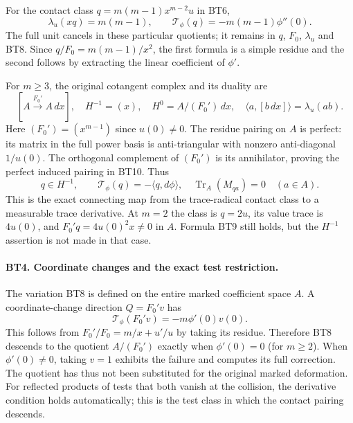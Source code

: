 \documentclass[11pt,a4paper]{article}
\theoremstyle{definition}\newtheorem{definition}[theorem]{Definition}
\begin{document}
For the contact class $q=m(m-1)x^{m-2}u$ in BT6,
\[
 \boxed{\lambda_u(xq)=m(m-1),\qquad
        \mathcal T_\phi(q)=-m(m-1)\phi''(0).}
 \tag{BT9}
\]
The full unit cancels in these particular quotients; it remains
in $q$, $F_0$, $\lambda_u$ and BT8. Since $q/F_0=m(m-1)/x^2$,
the first formula is a simple residue and the second follows by
extracting the linear coefficient of $\phi'$.

For $m\ge3$, the original cotangent complex and its duality are
\[
 [A\xrightarrow{F_0'}A\,dx],\quad
 H^{-1}=(x),\quad H^0=A/(F_0')\,dx,
 \quad\langle a,[b\,dx]\rangle=\lambda_u(ab).
 \tag{BT10}
\]
Here $(F_0')=(x^{m-1})$ since $u(0)\ne0$. The residue pairing
on $A$ is perfect: its matrix in the full power basis is
anti-triangular with nonzero anti-diagonal $1/u(0)$. The
orthogonal complement of $(F_0')$ is its annihilator, proving
the perfect induced pairing in BT10. Thus
\[
 q\in H^{-1},\qquad
 \mathcal T_\phi(q)=-\langle q,d\phi\rangle,
 \quad\operatorname{Tr}_A(M_{qa})=0\quad(a\in A).
 \tag{BT11}
\]
This is the exact connecting map from the trace-radical contact
class to a measurable trace derivative. At $m=2$ the class is
$q=2u$, its value trace is $4u(0)$, and
$F_0'q=4u(0)^2x\ne0$ in $A$. Formula BT9 still holds, but
the $H^{-1}$ assertion is not made in that case.

\paragraph{BT4. Coordinate changes and the exact test restriction.}
The variation BT8 is defined on the entire marked coefficient
space $A$. A coordinate-change direction $Q=F_0'v$ has
\[
 \mathcal T_\phi(F_0'v)=-m\phi'(0)v(0).
 \tag{BT12}
\]
This follows from $F_0'/F_0=m/x+u'/u$ by taking its residue.
Therefore BT8 descends to the quotient $A/(F_0')$ exactly when
$\phi'(0)=0$ (for $m\ge2$). When $\phi'(0)\ne0$, taking
$v=1$ exhibits the failure and computes its full correction.
The quotient has thus not been substituted for the original marked
deformation. For reflected products of tests that both vanish at
the collision, the derivative condition holds automatically; this
is the test class in which the contact pairing descends.
\end{document}
